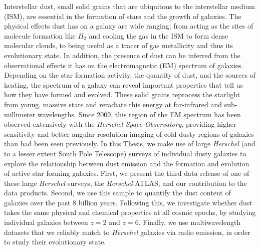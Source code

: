 Interstellar dust, small solid grains that are ubiquitous to the interstellar medium (ISM), are essential in the formation of stars and the growth of galaxies. The physical effects dust has on a galaxy are wide ranging; from acting as the sites of molecule formation like $H_2$ and cooling the gas in the ISM to form dense molecular clouds, to being useful as a tracer of gas metallicity and thus its evolutionary state. In addition, the presence of dust can be inferred from the observational effects it has on the electromagnetic (EM) spectrum of galaxies. Depending on the star formation activity, the quantity of dust, and the sources of heating, the spectrum of a galaxy can reveal important properties that tell us how they have formed and evolved. These solid grains reprocess the starlight from yonug, massive stars and reradiate this energy at far-infrared and sub-millimeter wavelengths. Since 2009, this region of the EM spectrum has been observed extensively with the \textit{Herschel Space Observatory}, providing higher sensitivity and better angular resolution imaging of cold dusty regions of galaxies than had been seen previously. In this Thesis, we make use of large \textit{Herschel} (and to a lesser extent South Pole Telescope) surveys of individual dusty galaxies to explore the relationship between dust emission and the formation and evolution of active star forming galaxies. First, we present the third data release of one of these large \textit{Herschel} surveys, the \textit{Herschel}-ATLAS, and our contribution to the data products. Second, we use this sample to quantify the dust content of galaxies over the past $8$ billion years. Following this, we investigate whether dust takes the same physical and chemical properties at all cosmic epochs, by studying individual galaxies between $z = 2$ and $z = 6$. Finally, we use multiwavelength datasets that we reliably match to \textit{Herschel} galaxies via radio emission, in order to study their evolutionary state.